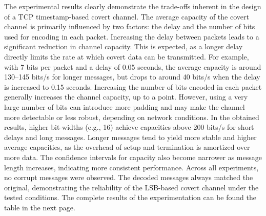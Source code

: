 \documentclass[10pt,a4paper]{article}
\begin{document}
The experimental results clearly demonstrate the trade-offs inherent in the design of a TCP timestamp-based covert channel. The average capacity of the covert channel is primarily influenced by two factors: the delay and the number of bits used for encoding in each packet.
Increasing the delay between packets leads to a significant reduction in channel capacity. This is expected, as a longer delay directly limits the rate at which covert data can be transmitted. For example, with 7 bits per packet and a delay of 0.05 seconds, the average capacity is around 130--145 bits/s for longer messages, but drops to around 40 bits/s when the delay is increased to 0.15 seconds.
Increasing the number of bits encoded in each packet generally increases the channel capacity, up to a point. However, using a very large number of bits can introduce more padding and may make the channel more detectable or less robust, depending on network conditions. In the obtained results, higher bit-widths (e.g., 16) achieve capacities above 200 bits/s for short delays and long messages.
Longer messages tend to yield more stable and higher average capacities, as the overhead of setup and termination is amortized over more data. The confidence intervals for capacity also become narrower as message length increases, indicating more consistent performance.
Across all experiments, no corrupt messages were observed. The decoded messages always matched the original, demonstrating the reliability of the LSB-based covert channel under the tested conditions.
The complete results of the experimentation can be found the table in the next page.
\end{document}
